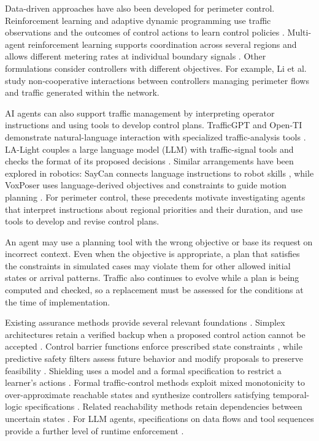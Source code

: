 \documentclass[final]{cas-sc}
\theoremstyle{definition}
\theoremstyle{plain}
\theoremstyle{definition}
\theoremstyle{plain}
\begin{document}
Data-driven approaches have also been developed for perimeter control.
Reinforcement learning and adaptive dynamic programming use traffic
observations and the outcomes of control actions to learn control policies
\cite{chen2022dataefficient,chen2024iadp}. Multi-agent reinforcement
learning supports coordination across several regions and allows
different metering rates at individual boundary signals
\cite{zhou2023scalable,yu2025physicsperimeter}. Other formulations consider
controllers with different objectives. For example, Li et al.\ \cite{li2024beyond}
study non-cooperative interactions between controllers managing perimeter
flows and traffic generated within the network.

AI agents can also support traffic management by interpreting operator
instructions and using tools to develop control plans. TrafficGPT and
Open-TI demonstrate natural-language interaction with specialized
traffic-analysis tools \cite{trafficgpt2024,openti2024}. LA-Light couples
a large language model (LLM) with traffic-signal tools and checks the format of its proposed
decisions \cite{wang2024lalight}. Similar arrangements have been explored in robotics: SayCan connects language
instructions to robot skills \cite{saycan2023}, while VoxPoser uses
language-derived objectives and constraints to guide motion planning
\cite{voxposer2023}. For perimeter control, these precedents motivate
investigating agents that interpret instructions about regional priorities
and their duration, and use tools to develop and revise control plans.

An agent may use a planning tool with the wrong objective or base its
request on incorrect context. Even when the objective is appropriate, a
plan that satisfies the constraints in simulated cases may violate them
for other allowed initial states or arrival patterns. Traffic also
continues to evolve while a plan is being computed and checked, so a
replacement must be assessed for the conditions at the time of
implementation.

Existing assurance methods provide several relevant foundations
\cite{hobbs2023runtime}. Simplex architectures retain a verified backup
when a proposed control action cannot be accepted \cite{mehmood2022black}.
Control barrier functions enforce prescribed state constraints
\cite{ames2017}, while predictive safety filters assess future behavior
and modify proposals to preserve feasibility \cite{wabersich2021}.
Shielding uses a model and a formal specification to restrict a learner's
actions \cite{alshiekh2018}. Formal traffic-control methods exploit mixed
monotonicity to over-approximate reachable states and synthesize controllers
satisfying temporal-logic specifications \cite{coogan2017formal}.
Related reachability methods retain dependencies between uncertain states
\cite{coogan2020mixed,kochdumper2021sparse}. For LLM agents, specifications
on data flows and tool sequences provide a further level of runtime
enforcement \cite{doshi2026tools}.
\end{document}
